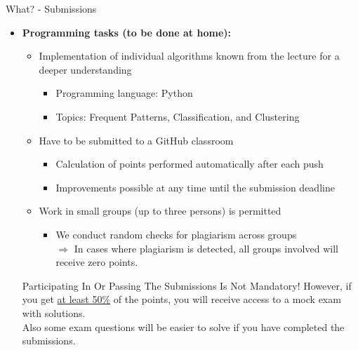 \begin{frame}{What? - Submissions}
	\begin{itemize}
		\item \textbf{Programming tasks (to be done at home):}
		      \begin{itemize}
			      \item Implementation of individual algorithms known from the lecture for a deeper understanding \\
			            \begin{itemize}
				            \item Programming language: Python
				            \item Topics: Frequent Patterns, Classification, and Clustering
			            \end{itemize}
			      \item Have to be submitted to a GitHub classroom
			            \begin{itemize}
				            \item Calculation of points performed automatically after each push
				            \item Improvements possible at any time until the submission deadline
			            \end{itemize}
			      \item Work in small groups (up to three persons) is permitted
			            \begin{itemize}
				            \item We conduct random checks for plagiarism across groups \\
				                  $\Rightarrow$ In cases where plagiarism is detected, all groups involved will receive zero points.
			            \end{itemize}
		      \end{itemize}
		      \begin{block}{Participating In Or Passing The Submissions Is Not Mandatory!}
			      However, if you get \underline{at least 50\%} of the points, you will receive access to a mock exam with solutions. \\
			      Also some exam questions will be easier to solve if you have completed the submissions.
		      \end{block}
	\end{itemize}
\end{frame}

